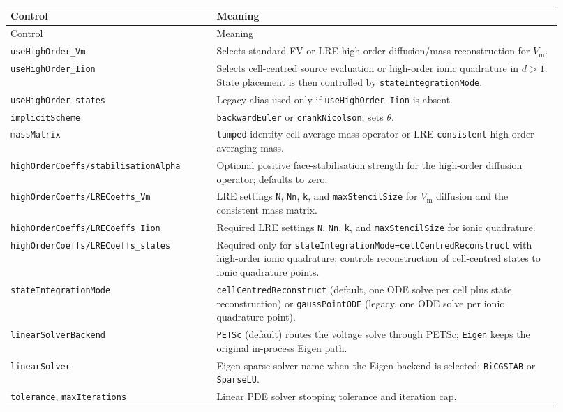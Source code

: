 \documentclass[11pt,a4paper]{article}
\newcommand{\code}[1]{\texttt{\small #1}}
\newcommand{\Vm}{V_{\text{m}}}
\begin{document}
\begin{longtable}{@{}p{0.34\linewidth}p{0.58\linewidth}@{}}
\toprule
Control & Meaning \\
\midrule
\endfirsthead
\toprule
Control & Meaning \\
\midrule
\endhead
\code{useHighOrder\_Vm} & Selects standard FV or LRE high-order diffusion/mass reconstruction for $\Vm$. \\
\code{useHighOrder\_Iion} & Selects cell-centred source evaluation or high-order ionic quadrature in $d>1$. State placement is then controlled by \code{stateIntegrationMode}. \\
\code{useHighOrder\_states} & Legacy alias used only if \code{useHighOrder\_Iion} is absent. \\
\code{implicitScheme} & \code{backwardEuler} or \code{crankNicolson}; sets $\theta$. \\
\code{massMatrix} & \code{lumped} identity cell-average mass operator or LRE \code{consistent} high-order averaging mass. \\
\code{highOrderCoeffs/stabilisationAlpha} & Optional positive face-stabilisation strength for the high-order diffusion operator; defaults to zero. \\
\code{highOrderCoeffs/LRECoeffs\_Vm} & LRE settings \code{N}, \code{Nn}, \code{k}, and \code{maxStencilSize} for $\Vm$ diffusion and the consistent mass matrix. \\
\code{highOrderCoeffs/LRECoeffs\_Iion} & Required LRE settings \code{N}, \code{Nn}, \code{k}, and \code{maxStencilSize} for ionic quadrature. \\
\code{highOrderCoeffs/LRECoeffs\_states} & Required only for \code{stateIntegrationMode=cellCentredReconstruct} with high-order ionic quadrature; controls reconstruction of cell-centred states to ionic quadrature points. \\
\code{stateIntegrationMode} & \code{cellCentredReconstruct} (default, one ODE solve per cell plus state reconstruction) or \code{gaussPointODE} (legacy, one ODE solve per ionic quadrature point). \\
\code{linearSolverBackend} & \code{PETSc} (default) routes the voltage solve through PETSc; \code{Eigen} keeps the original in-process Eigen path. \\
\code{linearSolver} & Eigen sparse solver name when the Eigen backend is selected: \code{BiCGSTAB} or \code{SparseLU}. \\
\code{tolerance}, \code{maxIterations} & Linear PDE solver stopping tolerance and iteration cap. \\

\end{longtable}
\end{document}
